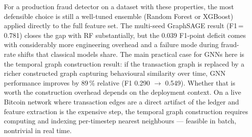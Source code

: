 For a production fraud detector on a dataset with these properties, the
most defensible choice is still a well-tuned ensemble (Random Forest or
XGBoost) applied directly to the full feature set. The multi-seed
GraphSAGE result (F1\,=\,0.781) closes the gap with RF substantially,
but the 0.039 F1-point deficit comes with considerably more engineering
overhead and a failure mode during fraud-rate shifts that classical models
share. The main practical case for GNNs here is the temporal graph
construction result: if the transaction graph is replaced by a richer
constructed graph capturing behavioural similarity over time, GNN
performance improves by 89\,\% relative (F1 0.290 $\to$ 0.549). Whether
that is worth the construction overhead depends on the deployment context.
On a live Bitcoin network where transaction edges are a direct artifact of
the ledger and feature extraction is the expensive step, the temporal graph
construction requires computing and indexing per-timestep nearest neighbours
— feasible in batch, nontrivial in real time.




